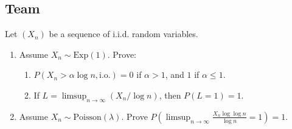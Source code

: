 \subsection{Team}

\begin{exercise}\label{probability:2012:7}
Let $(X_n)$ be a sequence of i.i.d. random variables.
\begin{enumerate}
    \item Assume $X_n \sim \mathrm{Exp}(1)$. Prove:
    \begin{enumerate}
        \item $P(X_n > \alpha \log n, \text{i.o.}) = 0$ if $\alpha > 1$, and $1$ if $\alpha \leq 1$.
        \item If $L = \limsup_{n \to \infty} (X_n / \log n)$, then $P(L=1)=1$.
    \end{enumerate}
    \item Assume $X_n \sim \mathrm{Poisson}(\lambda)$. Prove $P(\limsup_{n \to \infty} \frac{X_n \log \log n}{\log n} = 1) = 1$.
\end{enumerate}
\end{exercise}

